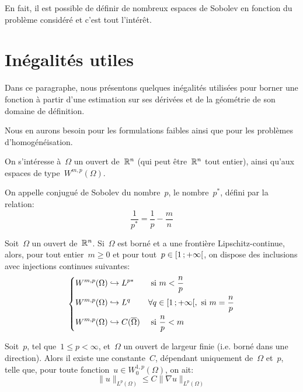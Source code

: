 \medskip
En fait, il est possible de définir de nombreux espaces de Sobolev en fonction du problème considéré et c'est tout l'intérêt.

\medskip
\section{Inégalités utiles}
Dans ce paragraphe, nous présentons quelques inégalités utilisées pour borner une fonction à partir d'une estimation sur
ses dérivées et de la géométrie de son domaine de définition.

Nous en aurons besoin pour les formulations faibles ainsi que pour les problèmes d'homogénéisation.
\medskip
\begin{definition}
On s'intéresse à~$\Omega$ un ouvert de~$\mathbb R^n$ (qui peut être~$\mathbb R^n$ tout entier), ainsi qu'aux
espaces de type~$W^{m,p}(\Omega)$.

On appelle conjugué de Sobolev du nombre~$p$, le nombre~$p^*$, défini par la relation:
\begin{equation}
  \frac{1}{p^*} = \frac{1}{p} - \frac{m}{n}
\end{equation}
\end{definition}
\begin{theoreme}
Soit~$\Omega$ un ouvert de~$\mathbb R^n$. Si~$\Omega$ est borné et a une frontière Lipschitz-continue,
alors, pour tout entier~$m\ge 0$ et pour tout~$p\in\mathopen{[}1\,;+\infty\mathclose{[}$, on dispose des inclusions avec injections continues
suivantes:
\begin{equation}
\left\{\begin{aligned}
&W^{m,p}(\Omega) \hookrightarrow L^{p*} && \text{ si } m<\frac{n}p\\
&W^{m,p}(\Omega) \hookrightarrow L^q && \forall q\in\mathopen{[}1\,;+\infty\mathclose{[}, \text{ si } m=\frac{n}p\\
&W^{m,p}(\Omega) \hookrightarrow C(\overline{\Omega}) && \text{ si } \frac{n}p<m
\end{aligned}\right.
\end{equation}
\end{theoreme}


\medskip

\begin{theoreme}
Soit~$p$, tel que~$1 \le p <\infty$, et~$\Omega$ un ouvert de largeur finie
(i.e. borné dans une direction).
Alors il existe une constante~$C$, dépendant uniquement de~$\Omega$ et~$p$, telle que,
pour toute fonction~$u\in W_0^{1,p}(\Omega)$, on ait:
\begin{equation}
\|u\|_{L^p(\Omega)} \le C \|\nabla u\|_{L^p(\Omega)}
\end{equation}
\end{theoreme}


